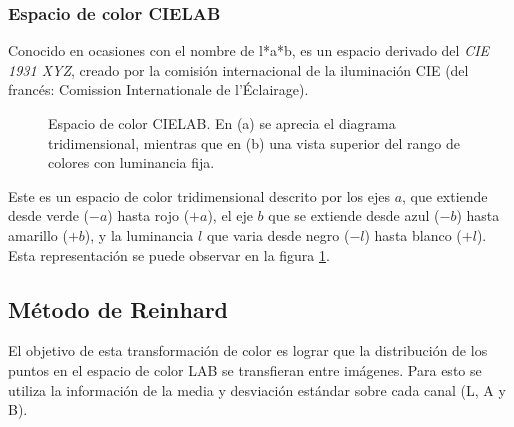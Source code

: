 \subsubsection*{Espacio de color CIELAB}

Conocido en ocasiones con el nombre de l*a*b, es un espacio derivado del \textit{CIE 1931 XYZ}, creado por la comisión internacional de la iluminación CIE (del francés: Comission Internationale de l'Éclairage).

\begin{figure}[h]
	\centering     %
	
	\caption[Espacio de color CIELAB]{Espacio de color CIELAB. En (a) se aprecia el diagrama tridimensional, mientras que en (b) una vista superior del rango de colores con luminancia fija.}
	\label{imagen:lab-color}
\end{figure}

Este es un espacio de color tridimensional descrito por los ejes $a$, que extiende desde verde ($-a$) hasta rojo ($+a$), el eje $b$ que se extiende desde azul ($-b$) hasta amarillo ($+b$), y la luminancia $l$ que varia desde negro ($-l$) hasta blanco ($+l$). Esta representación se puede observar en la figura \ref{imagen:lab-color}.

\subsection{Método de Reinhard}
El objetivo de esta transformación de color es lograr que la distribución de los puntos en el espacio de color LAB se transfieran entre imágenes. Para esto se utiliza la información de la media y desviación estándar sobre cada canal (L, A y B).

